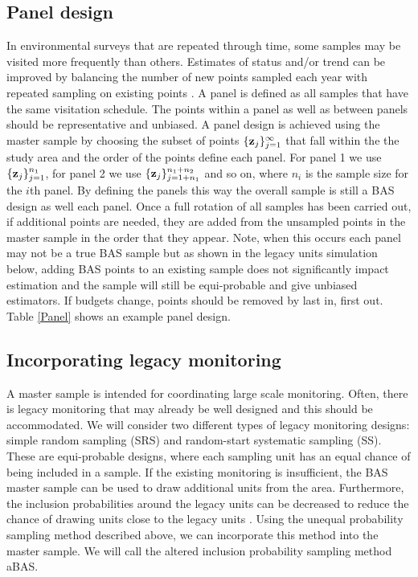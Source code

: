 \documentclass[titlepage]{article}
\begin{document}
\subsection{Panel design}
In environmental surveys that are repeated through time, some samples may be visited more frequently than others. Estimates of status and/or trend can be improved by balancing the number of new points sampled each year with repeated sampling on existing points \citep{Urquhart1999}. A panel is defined as all samples that have the same visitation schedule. The points within a panel as well as between panels should be representative and unbiased. A panel design is achieved using the master sample by choosing the subset of points $\{{\bf z}_j\}_{j=1}^{\infty}$ that fall within the the study area and the order of the points define each panel. For panel 1 we use $\{{\bf z}_j\}_{j=1}^{n_1}$, for panel 2 we use $\{{\bf z}_j\}_{j=1 + n_1}^{n_1 + n_2}$ and so on, where $n_i$ is the sample size for the $i$th panel. By defining the panels this way the overall sample is still a BAS design as well each panel. Once a full rotation of all samples has been carried out, if additional points are needed, they are added from the unsampled points in the master sample in the order that they appear. Note, when this occurs each panel may not be a true BAS sample but as shown in the legacy units simulation below, adding BAS points to an existing sample does not significantly impact estimation and the sample will still be equi-probable and give unbiased estimators. If budgets change, points should be removed by last in, first out. Table \ref{Panel} shows an example panel design.

\subsection{Incorporating legacy monitoring}
A master sample is intended for coordinating large scale monitoring. Often, there is legacy monitoring that may already be well designed and this should be accommodated. We will consider two different types of legacy monitoring designs: simple random sampling (SRS) and random-start systematic sampling (SS). These are equi-probable designs, where each sampling unit has an equal chance of being included in a sample. If the existing monitoring is insufficient, the BAS master sample can be used to draw additional units from the area. Furthermore, the inclusion probabilities around the legacy units can be decreased to reduce the chance of drawing units close to the legacy units \citep{Foster2017}. Using the unequal probability sampling method described above, we can incorporate this method into the master sample. We will call the altered inclusion probability sampling method aBAS.
\end{document}
